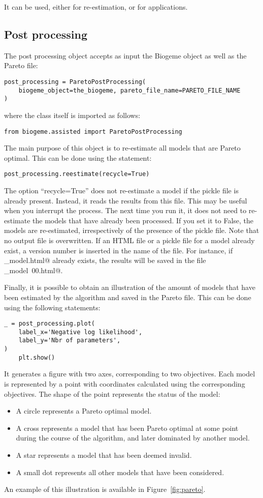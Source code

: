 \documentclass[12pt,a4paper]{article}
\begin{document}
It can  be used, either for re-estimation, or for applications.

\subsection{Post processing}

The post processing object accepts as input the Biogeme object as well as the Pareto file:
\begin{lstlisting}
post_processing = ParetoPostProcessing(
    biogeme_object=the_biogeme, pareto_file_name=PARETO_FILE_NAME
)
\end{lstlisting}
where the class itself is imported as follows:
\begin{lstlisting}
from biogeme.assisted import ParetoPostProcessing
\end{lstlisting}

The main purpose of this object is to re-estimate all models that are Pareto optimal. This can be done using the statement:
\begin{lstlisting}
post_processing.reestimate(recycle=True)
\end{lstlisting}
The option ``recycle=True'' does not re-estimate a model if the pickle
file is already present. Instead, it reads the results from this
file. This may be useful when you interrupt the process. The next time
you run it, it does not need to re-estimate the models that have
already been processed. If you set it to False, the models are re-estimated, irrespectively of the presence of the pickle file. Note that no output file is overwritten. If an HTML file or a pickle file for a model already exist, a version number is inserted in the name of the file. For instance, if \lstinline@my_model.html@ already exists, the results will be saved in the file \lstinline@my_model~00.html@.

Finally, it is possible to obtain an illustration of the amount of
models that have been estimated by the algorithm and saved in the
Pareto file. This can be done using the following statements:
\begin{lstlisting}
_ = post_processing.plot(
    label_x='Negative log likelihood',
    label_y='Nbr of parameters',
)
    plt.show()
\end{lstlisting}

It generates a figure with two axes, corresponding to two objectives. Each model is represented by a point with coordinates calculated using the corresponding objectives. The shape of the point represents the status of the model:
\begin{itemize}
\item A circle represents a Pareto optimal model.
\item A cross represents a model that has been Pareto optimal at some point during the course of the algorithm, and later dominated by another model.
\item A star represents a model that has been deemed invalid.
\item A small dot represents all other models that have been considered.
\end{itemize}
An example of this illustration is available in Figure~\vref{fig:pareto}.
\end{document}
